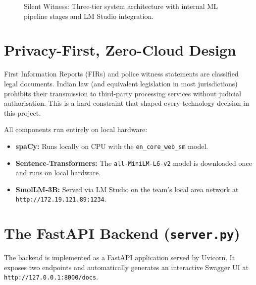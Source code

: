 \documentclass[12pt,a4paper]{report}
\begin{document}
\begin{figure}[h]
\caption{Silent Witness: Three-tier system architecture with internal ML pipeline stages and LM Studio integration.}
\label{fig:arch}
\end{figure}

\section{Privacy-First, Zero-Cloud Design}

First Information Reports (FIRs) and police witness statements are classified legal documents. Indian law (and equivalent legislation in most jurisdictions) prohibits their transmission to third-party processing services without judicial authorisation. This is a hard constraint that shaped every technology decision in this project.

All components run entirely on local hardware:
\begin{itemize}[leftmargin=2cm]
    \item \textbf{spaCy:} Runs locally on CPU with the \texttt{en\_core\_web\_sm} model.
    \item \textbf{Sentence-Transformers:} The \texttt{all-MiniLM-L6-v2} model is downloaded once and runs on local hardware.
    \item \textbf{SmolLM-3B:} Served via LM Studio on the team's local area network at \texttt{http://172.19.121.89:1234}.
\end{itemize}

\section{The FastAPI Backend (\texttt{server.py})}

The backend is implemented as a FastAPI application served by Uvicorn. It exposes two endpoints and automatically generates an interactive Swagger UI at \texttt{http://127.0.0.1:8000/docs}.
\end{document}
